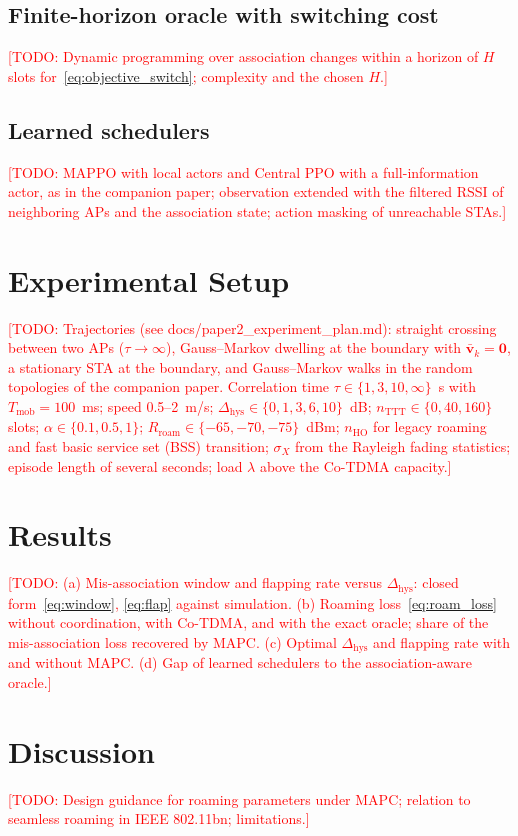 \documentclass{ieeeaccess}
\newcommand{\todo}[1]{\textcolor{red}{[TODO: #1]}}
\begin{document}
\subsection{Finite-horizon oracle with switching cost}
\todo{Dynamic programming over association changes within a horizon of $H$ slots for~\eqref{eq:objective_switch}; complexity and the chosen $H$.}

\subsection{Learned schedulers}
\todo{MAPPO with local actors and Central PPO with a full-information actor, as in the companion paper; observation extended with the filtered RSSI of neighboring APs and the association state; action masking of unreachable STAs.}

\section{Experimental Setup}
\label{sec:setup}
\todo{Trajectories (see docs/paper2\_experiment\_plan.md): straight crossing between two APs ($\tau \to \infty$), Gauss--Markov dwelling at the boundary with $\bar{\mathbf{v}}_k = \mathbf{0}$, a stationary STA at the boundary, and Gauss--Markov walks in the random topologies of the companion paper. Correlation time $\tau \in \{1, 3, 10, \infty\}$~s with $T_{\text{mob}} = 100$~ms; speed 0.5--2~m/s; $\Delta_{\text{hys}} \in \{0, 1, 3, 6, 10\}$~dB; $n_{\text{TTT}} \in \{0, 40, 160\}$ slots; $\alpha \in \{0.1, 0.5, 1\}$; $R_{\text{roam}} \in \{-65, -70, -75\}$~dBm; $n_{\text{HO}}$ for legacy roaming and fast basic service set (BSS) transition; $\sigma_X$ from the Rayleigh fading statistics; episode length of several seconds; load $\lambda$ above the Co-TDMA capacity.}

\section{Results}
\label{sec:results}
\todo{(a) Mis-association window and flapping rate versus $\Delta_{\text{hys}}$: closed form~\eqref{eq:window}, \eqref{eq:flap} against simulation. (b) Roaming loss~\eqref{eq:roam_loss} without coordination, with Co-TDMA, and with the exact oracle; share of the mis-association loss recovered by MAPC. (c) Optimal $\Delta_{\text{hys}}$ and flapping rate with and without MAPC. (d) Gap of learned schedulers to the association-aware oracle.}

\section{Discussion}
\label{sec:discussion}
\todo{Design guidance for roaming parameters under MAPC; relation to seamless roaming in IEEE 802.11bn; limitations.}
\end{document}
